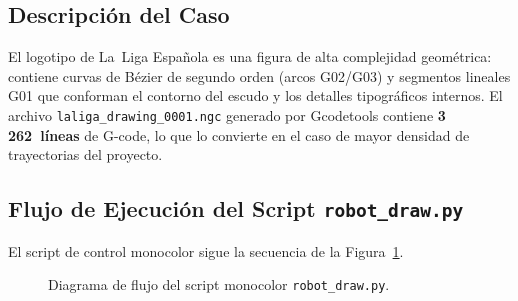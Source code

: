 \documentclass[journal,compsoc]{IEEEtran}
\begin{document}
\subsection{Descripción del Caso}

El logotipo de La~Liga Española es una figura de alta complejidad geométrica: contiene curvas de Bézier de segundo orden (arcos G02/G03) y segmentos lineales G01 que conforman el contorno del escudo y los detalles tipográficos internos. El archivo \texttt{laliga\_drawing\_0001.ngc} generado por Gcodetools contiene \textbf{3\,262~líneas} de G-code, lo que lo convierte en el caso de mayor densidad de trayectorias del proyecto.

\subsection{Flujo de Ejecución del Script \texttt{robot\_draw.py}}

El script de control monocolor sigue la secuencia de la Figura~\ref{fig:flow_mono}.

\begin{figure}[h]
    \centering
    \caption{Diagrama de flujo del script monocolor \texttt{robot\_draw.py}.}
    \label{fig:flow_mono}
\end{figure}
\end{document}
